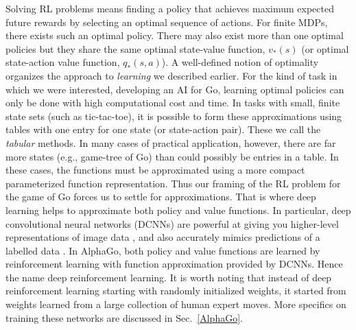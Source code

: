 Solving RL problems means finding a policy that achieves maximum expected future rewards by selecting an optimal sequence of actions. For finite MDPs, there exists such an optimal policy. There may also exist more than one optimal policies but they share the same optimal state-value function, $v_*(s)$ (or optimal state-action value function, $q_*(s,a)$). A well-defined notion of optimality organizes the approach to \textit{learning} we described earlier. For the kind of task in which we were interested, developing an AI for Go, learning optimal policies can only be done with high computational cost and time. In tasks with small, finite state sets (such as tic-tac-toe), it is possible to form these approximations using tables with one entry for one state (or state-action pair). These we call the \textit{tabular} methods. In many cases of practical application, however, there are far more states (e.g., game-tree of Go) than could possibly be entries in a table. In these cases, the functions must be approximated using a more compact parameterized function representation. Thus our framing of the RL problem for the game of Go forces us to settle for approximations. That is where deep learning helps to approximate both policy and value functions. In particular, deep convolutional neural networks (DCNNs) are powerful at giving you higher-level representations of image data \cite{b19,b20}, and also accurately mimics predictions of a labelled data \cite{b21,b22,b23}. In AlphaGo, both policy and value functions are learned by reinforcement learning with function approximation provided by DCNNs. Hence the name deep reinforcement learning. It is worth noting that instead of deep reinforcement learning starting with randomly initialized weights, it started from weights learned from a large collection of human expert moves. More specifics on training these networks are discussed in Sec.~\ref{AlphaGo}.




